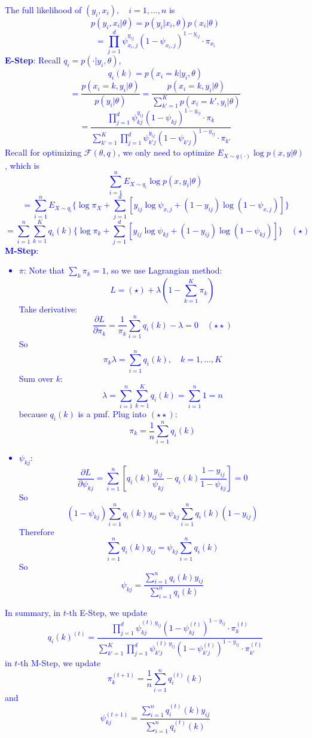 \documentclass[12pt]{book}
\theoremstyle{definition}
\theoremstyle{remark}
\begin{document}
\textcolor{blue}{
The full likelihood of $(y_i, x_i),\quad i=1,\dots, n$ is 
\[p(y_i, x_i|\theta) = p(y_i|x_i,\theta)p(x_i|\theta)\]
\[ = \prod_{j=1}^d\psi_{x_i,j}^{y_{ij}}(1-\psi_{x_i,j})^{1-y_{ij}}\cdot \pi_{x_i}\]
\textbf{E-Step}: 
Recall $q_i = p(\cdot|y_i,\theta)$, 
\[q_i(k) = p(x_i = k|y_i,\theta)\]
\[=\frac{p(x_i = k,y_i|\theta)}{p(y_i|\theta)} = \frac{p(x_i = k,y_i|\theta)}{\sum_{k'=1}^Kp(x_i = k',y_i|\theta)} \]
\[ = \frac{\prod_{j=1}^d\psi_{kj}^{y_{ij}}(1-\psi_{kj})^{1-y_{ij}}\cdot \pi_k}{\sum_{k'=1}^K\prod_{j=1}^d\psi_{k'j}^{y_{ij}}(1-\psi_{k'j})^{1-y_{ij}}\cdot \pi_{k'}}\]
Recall for optimizing $\mathcal{F}(\theta,q)$, we only need to optimize $E_{X\sim q(\cdot)}\log p(x,y|\theta)$, which is 
\[\sum_{i=1}^nE_{X\sim q_i}\log p(x,y_i|\theta)\]
\[ = \sum_{i=1}^nE_{X\sim q_i}\{\log\pi_X+\sum_{j=1}^d[y_{ij}\log\psi_{x,j}+(1-y_{ij})\log(1-\psi_{x,j})]\}\]
\[ = \sum_{i=1}^n\sum_{k=1}^K q_i(k)\{\log\pi_k+\sum_{j=1}^d[y_{ij}\log\psi_{kj}+(1-y_{ij})\log(1-\psi_{kj})]\}\quad (\star)\]
\textbf{M-Step}:
\begin{itemize}
    \item $\pi$:
    Note that $\sum_k \pi_k = 1$, so we use Lagrangian method:
    \[L = (\star) + \lambda (1-\sum_{k=1}^K \pi_k)\]
    Take derivative:
    \[\frac{\partial L}{\partial \pi_k}  = \frac{1}{\pi_k}\sum_{i=1}^n q_i(k) - \lambda = 0 \quad (\star\star)\]
    So \[\pi_k\lambda=\sum_{i=1}^nq_i(k), \quad k=1,\dots, K\]
    Sum over $k$:
    \[\lambda = \sum_{i=1}^n\sum_{k=1}^Kq_i(k) = \sum_{i=1}^n 1 = n\]because $q_i(k)$ is a pmf.
    Plug into $(\star\star)$:
    \[\pi_k = \frac{1}{n}\sum_{i=1}^nq_i(k)\]
    \item $\psi_{kj}$:
    \[\frac{\partial L}{\partial \psi_{kj}} = \sum_{i=1}^n[q_i(k)\frac{y_{ij}}{\psi_{kj}} - q_i(k)\frac{1-y_{ij}}{1-\psi_{kj}}] = 0\]
    So\[(1-\psi_{kj})\sum_{i=1}^nq_i(k)y_{ij}= \psi_{kj}\sum_{i=1}^nq_i(k)(1-y_{ij})\]
    Therefore\[\sum_{i=1}^nq_i(k)y_{ij} = \psi_{kj}\sum_{i=1}^nq_i(k)\]
    So \[\psi_{kj} =\frac{\sum_{i=1}^nq_i(k)y_{ij}}{\sum_{i=1}^nq_i(k)}\]
\end{itemize}
In summary, in $t$-th E-Step, we update
\[q_i(k)^{(t)} = \frac{\prod_{j=1}^d\psi_{kj}^{(t) \ y_{ij}}(1-\psi_{kj}^{(t)})^{1-y_{ij}}\cdot \pi_k^{(t)}}{\sum_{k'=1}^K\prod_{j=1}^d\psi_{k'j}^{(t) \ y_{ij}}(1-\psi_{k'j}^{(t)})^{1-y_{ij}}\cdot \pi_{k'}^{(t)}}\]
in $t$-th M-Step, we update
\[\pi_k^{(t+1)} = \frac{1}{n}\sum_{i=1}^nq_i^{(t)}(k)\]
and
\[\psi_{kj}^{(t+1)} =\frac{\sum_{i=1}^nq_i^{(t)}(k)y_{ij}}{\sum_{i=1}^nq_i^{(t)}(k)}\]
}

\newpage
\end{document}
